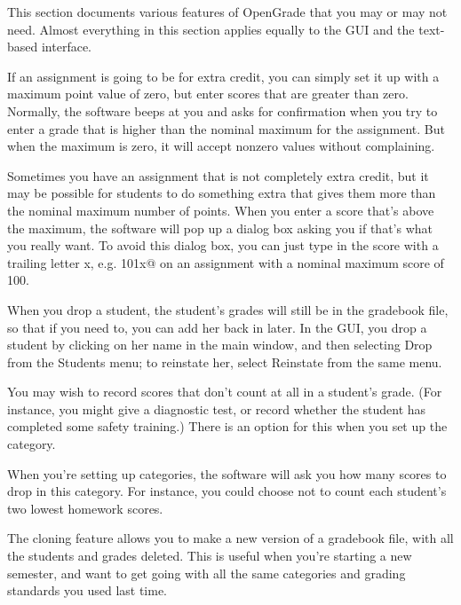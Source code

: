 \documentclass{opengrade_doc}
\begin{document}
\label{goodies}
This section documents various features of OpenGrade that you may
or may not need. Almost everything in this section applies equally to the
GUI and the text-based interface.


If an assignment is going to be for extra credit, you can simply
set it up with a maximum point value of zero, but enter scores that
are greater than zero. Normally, the software beeps at you and asks
for confirmation when you try to enter a grade that is higher than the
nominal maximum for the assignment. But when the maximum is zero,
it will accept nonzero values without complaining. 

Sometimes you have an assignment that is not completely extra credit,
but it may be possible for students to do something extra that gives
them more than the nominal maximum number of points. 
When you enter a score that's above the maximum, the software will
pop up a dialog box asking you if that's what you really want. To
avoid this dialog box, you can just type in the score with a trailing
letter x, e.g. \verb@101x@ on an assignment with a nominal maximum score
of 100.

When you drop a student, the student's grades will still be in
the gradebook file, so that if you need to, you can add her back
in later. In the GUI, you drop a student by clicking on her name
in the main window, and then selecting Drop from the
Students menu; to reinstate her, select Reinstate from the
same menu.

You may wish to record scores that don't count at all in a student's
grade. (For instance, you might give a diagnostic test, or record whether
the student has completed some safety training.)
There is an option for this when you set up the category.

When you're setting up categories, the software will ask you how many
scores to drop in this category. For instance, you could choose not
to count each student's two lowest homework scores.

The cloning feature allows you to make a new version of a gradebook file,
with all the students and grades deleted. This is useful when you're
starting a new semester, and want to get going with all the same
categories and grading standards you used last time.
\end{document}
